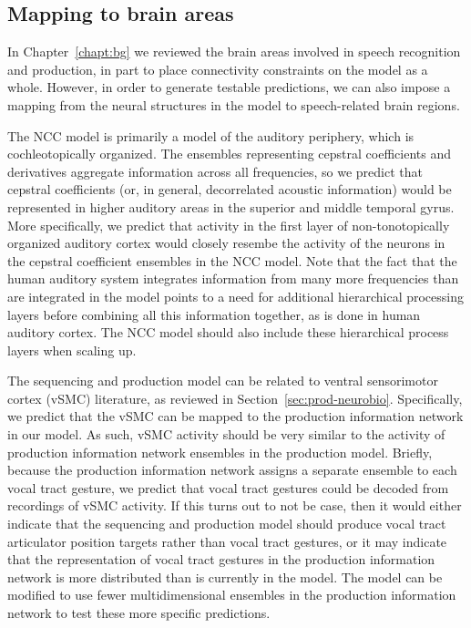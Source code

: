 \subsection{Mapping to brain areas}

In Chapter~\ref{chapt:bg}
we reviewed the brain areas
involved in speech recognition and production,
in part to place connectivity constraints
on the model as a whole.
However, in order to generate testable predictions,
we can also impose a mapping from
the neural structures in the model
to speech-related brain regions.

The NCC model is primarily a model
of the auditory periphery,
which is cochleotopically organized.
The ensembles representing
cepstral coefficients and derivatives
aggregate information across
all frequencies,
so we predict that cepstral coefficients
(or, in general, decorrelated acoustic information)
would be represented
in higher auditory areas in the
superior and middle temporal gyrus.
More specifically,
we predict that activity in the
first layer of non-tonotopically organized
auditory cortex would
closely resembe the activity of
the neurons in the cepstral coefficient
ensembles in the NCC model.
Note that the fact that the
human auditory system integrates information
from many more frequencies than
are integrated in the model
points to a need for additional
hierarchical processing layers
before combining all this information together,
as is done in human auditory cortex.
The NCC model should also
include these hierarchical process layers
when scaling up.

The sequencing and production model
can be related to
ventral sensorimotor cortex (vSMC) literature,
as reviewed in Section~\ref{sec:prod-neurobio}.
Specifically, we predict that
the vSMC can be mapped to the
production information network in our model.
As such, vSMC activity should be very similar
to the activity of production information network
ensembles in the production model.
Briefly, because the production information network
assigns a separate ensemble to each
vocal tract gesture, we predict that
vocal tract gestures could be decoded
from recordings of vSMC activity.
If this turns out to not be case,
then it would either indicate that
the sequencing and production model
should produce vocal tract articulator position targets
rather than vocal tract gestures,
or it may indicate that the representation
of vocal tract gestures
in the production information network
is more distributed than is currently in the model.
The model can be modified to use
fewer multidimensional ensembles
in the production information network to test
these more specific predictions.

